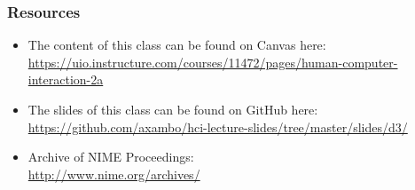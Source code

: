\documentclass[screen, aspectratio=43]{beamer}
\begin{document}
%
\begin{frame}
\frametitle{Resources}
\begin{itemize}
\item The content of this class can be found on Canvas here:\\
\url{https://uio.instructure.com/courses/11472/pages/human-computer-interaction-2a}
\item The slides of this class can be found on GitHub here: \\
\url{https://github.com/axambo/hci-lecture-slides/tree/master/slides/d3/}
\item Archive of NIME Proceedings:\\
\url{http://www.nime.org/archives/}
\end{itemize}
\end{frame}
%
%
\end{document}
